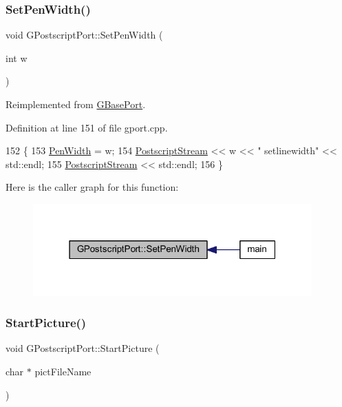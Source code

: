 \subsubsection{\texorpdfstring{Set\+Pen\+Width()}{SetPenWidth()}}
{\footnotesize\ttfamily void G\+Postscript\+Port\+::\+Set\+Pen\+Width (\begin{DoxyParamCaption}\item[{int}]{w }\end{DoxyParamCaption})\hspace{0.3cm}{\ttfamily [virtual]}}



Reimplemented from \mbox{\hyperlink{class_g_base_port_aa2fd1fbe050cfea5a21afb7d4cecaa61}{G\+Base\+Port}}.



Definition at line 151 of file gport.\+cpp.


\begin{DoxyCode}
152 \{
153     \mbox{\hyperlink{class_g_base_port_a9a76c3a8af8d0e9f29035d02d8f038c1}{PenWidth}} = w;
154     \mbox{\hyperlink{class_g_postscript_port_a0fb398f1c65b3ccb0efccd509f60d20d}{PostscriptStream}} << w << \textcolor{stringliteral}{" setlinewidth"}                        << std::endl;
155     \mbox{\hyperlink{class_g_postscript_port_a0fb398f1c65b3ccb0efccd509f60d20d}{PostscriptStream}} << std::endl;
156 \}
\end{DoxyCode}
Here is the caller graph for this function\+:\nopagebreak
\begin{figure}[H]
\begin{center}
\leavevmode
\includegraphics[width=304pt]{class_g_postscript_port_a63e3cf185f620f9f24ec40f01dc3b02c_icgraph}
\end{center}
\end{figure}
\mbox{\label{class_g_postscript_port_a4c9faebb953228964ca032e75ed40bcc}} 
\subsubsection{\texorpdfstring{Start\+Picture()}{StartPicture()}}
{\footnotesize\ttfamily void G\+Postscript\+Port\+::\+Start\+Picture (\begin{DoxyParamCaption}\item[{char $\ast$}]{pict\+File\+Name }\end{DoxyParamCaption})\hspace{0.3cm}{\ttfamily [virtual]}}



